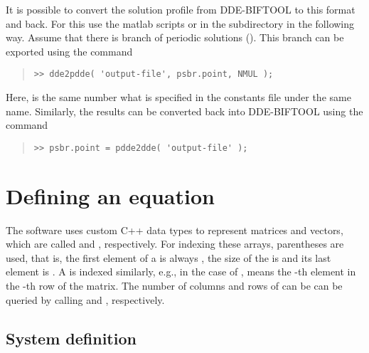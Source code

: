 \documentclass[10pt,a4paper]{ddedoc}
\begin{document}
It is possible to convert the solution profile from DDE-BIFTOOL to this format and back. For this use the matlab scripts  or  in the  subdirectory in the following way. Assume that there is branch of periodic solutions (). This branch can be exported using the command
{ \small \begin{quote} \begin{lstlisting}[frame=single]
>> dde2pdde( 'output-file', psbr.point, NMUL );
\end{lstlisting} \end{quote} } \noindent
Here,  is the same number what is specified in the constants file under the same name.
Similarly, the results can be converted back into DDE-BIFTOOL using the command
{ \small \begin{quote} \begin{lstlisting}[frame=single]
>> psbr.point = pdde2dde( 'output-file' );
\end{lstlisting} \end{quote} } \noindent

\section{Defining an equation}

The software uses custom C++ data types to represent matrices and vectors,
which are called  and , respectively. For indexing
these arrays, parentheses are used, that is, the first element of a
  is always , the size of the  is  and its last
element is . A  is indexed similarly, e.g., in
the case of ,  means the -th element in the
-th row of the matrix. The number of columns and rows of  can be
can be queried by calling  and , respectively.

\subsection{System definition}\label{sysdef}
\end{document}
